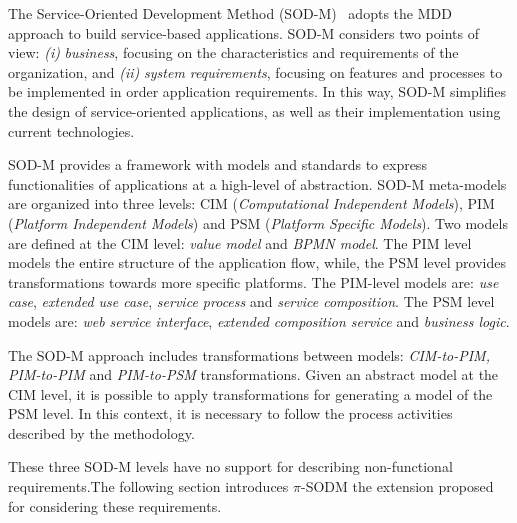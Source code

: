 
The Service-Oriented Development Method (SOD-M)~\cite{decastro1}
adopts  the MDD approach to build service-based applications. SOD-M considers two points of view:
\textit{(i)} \textit{business}, focusing on the characteristics and requirements
of the organization, and \textit{(ii)} \textit{system requirements}, focusing on
features and processes to be implemented in order application requirements. In
this way, SOD-M  simplifies the design of service-oriented applications, as
well as their implementation using current technologies.

SOD-M provides a framework with models and standards to express functionalities
of applications at a high-level of abstraction. SOD-M meta-models are organized 
into three levels: CIM (\textit{Computational Independent Models}), 
PIM (\textit{Platform Independent Models}) and PSM (\textit{Platform Specific Models}).
Two models are defined at the CIM level: \textit{value model} 
and \textit{BPMN model}. 
The PIM level models the entire structure of the application flow,
while, the PSM level provides transformations towards more specific platforms.
The PIM-level models are: \textit{use case}, \textit{extended use case}, \textit{service process} and
\textit{service composition}. The PSM level models are: \textit{web service interface}, \textit{extended composition service} and \textit{business logic}. 
 

The SOD-M approach includes transformations between models:
\textit{CIM-to-PIM, PIM-to-PIM} and \textit{PIM-to-PSM} transformations. Given
an abstract model at the CIM level, it is possible to apply transformations for
generating a model of the PSM level. In this context, it is necessary to
follow the process activities described by the methodology. 

These three SOD-M levels have no support for describing non-functional requirements.The following section introduces $\pi$-SODM the extension proposed for considering these requirements.



